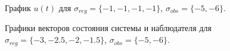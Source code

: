\begin{figure}[!h]
	\caption{График $u(t)$ для $\sigma_{reg} = \{ -1, -1, -1, -1\}$, $\sigma_{obs}= \{-5, -6 \}$.}
	\label{3_u_k1l2}
\end{figure}


\begin{figure}[!h]
	\caption{Графики векторов состояния системы и наблюдателя для $\sigma_{reg} = \{ -3, -2.5, -2, -1.5\}$, $\sigma_{obs}= \{-5, -6 \}$.}
	\label{3_x_k2l2}
\end{figure}

